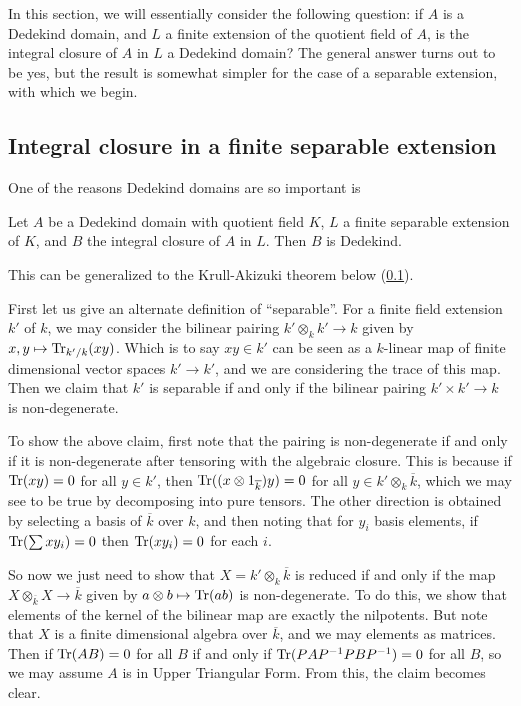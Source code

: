 In this section, we will essentially consider the following question: if $A$
is a Dedekind domain, and $L$ a finite extension of the quotient field of $A$,
is the integral closure of $A$ in $L$ a Dedekind domain? The general answer
turns out to be yes, but the result is somewhat simpler for the case of a
separable extension, with which we begin.

\subsection{Integral closure in a finite separable extension}

One of the reasons Dedekind domains are so important is
\begin{theorem} \label{intclosdedekind} Let $A$ be a Dedekind domain with quotient field $K$, $L$ a finite separable extension of $K$, and $B$ the integral closure of $A$ in $L$.  Then $B$ is Dedekind.
\end{theorem}

This can be generalized to the Krull-Akizuki theorem below (\cref{}).

First let us give an alternate definition of ``separable''.
For a finite field extension $k'$ of $k$, we may consider the bilinear pairing
$k' \otimes_k k' \to k$ given by $x,y \mapsto \operatorname{Tr}_{k'/k}(xy)$. Which is to say $xy \in k'$ can be seen as a $k$-linear map of finite dimensional vector spaces $k' \to k'$, and we are considering the trace of this map. Then we claim that $k'$ is separable if and only if the bilinear pairing $k' \times k' \to k$ is non-degenerate.

To show the above claim, first note that the pairing is non-degenerate if and
only if it is non-degenerate after tensoring with the algebraic closure. This
is because if $\operatorname{Tr}(xy)=0$ for all $y \in k'$, then $\operatorname{Tr}((x\otimes
1_{\overline{k}})y)=0$ for all $y \in k' \otimes_k \overline{k}$, which we may see to be true by decomposing into pure tensors. The other direction is obtained by selecting a basis of $\overline{k}$ over $k$, and then noting that for $y_i$ basis elements, if $\operatorname{Tr}(\sum x y_i)=0$ then $\operatorname{Tr}(xy_i)=0$ for each $i$. 

So now we just need to show that $X=k'  \otimes_k \overline{k}$ is reduced if
and only if the map $X \otimes_{\overline{k}} X \to \overline{k}$ given by $a \otimes b \mapsto \operatorname{Tr}(ab)$ is non-degenerate. To do this, we show that elements of the kernel of the bilinear map are exactly the nilpotents. But note that $X$ is a finite dimensional algebra over $\overline{k}$, and we may elements as matrices. Then if $\operatorname{Tr}(AB)=0$ for all $B$ if and only if $\operatorname{Tr}(PAP^{-1}PBP^{-1})=0$ for all $B$, so we may assume $A$ is in Upper Triangular Form. From this, the claim becomes clear.


